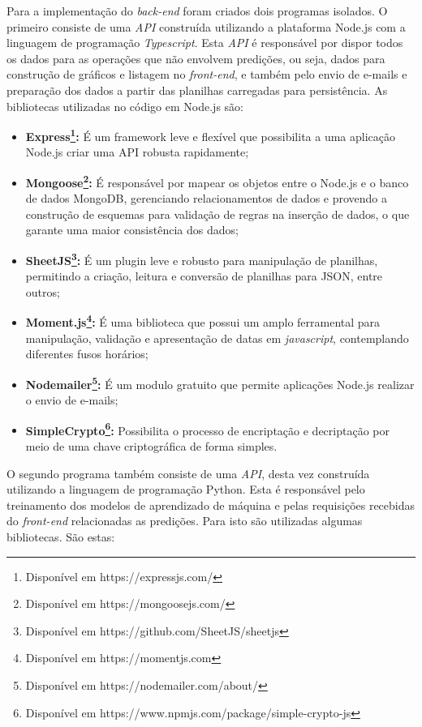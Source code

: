 Para a implementação do \textit{back-end} foram criados dois programas isolados. 
O primeiro consiste de uma \textit{API} construída utilizando a plataforma Node.js com a linguagem de programação \textit{Typescript}. 
Esta \textit{API} é responsável por dispor todos os dados para as operações que não envolvem predições, ou seja, dados para construção de gráficos e listagem no \textit{front-end}, e também pelo envio de e-mails e preparação dos dados a partir das planilhas carregadas para persistência.
As bibliotecas utilizadas no código em Node.js são:
\begin{itemize}[topsep=5pt]
    \item \textbf{Express\footnote{Disponível em https://expressjs.com/}:} É um framework leve e flexível que possibilita a uma aplicação Node.js criar uma API robusta rapidamente;
    \item \textbf{Mongoose\footnote{Disponível em https://mongoosejs.com/}:} É responsável por mapear os objetos entre o Node.js e o banco de dados MongoDB, gerenciando relacionamentos de dados e provendo a construção de esquemas para validação de regras na inserção de dados, o que garante uma maior consistência dos dados;
    \item \textbf{SheetJS\footnote{Disponível em https://github.com/SheetJS/sheetjs}:} É um plugin leve e robusto para manipulação de planilhas, permitindo a criação, leitura e conversão de planilhas para JSON, entre outros;
    \item \textbf{Moment.js\footnote{Disponível em https://momentjs.com}:} É uma biblioteca que possui um amplo ferramental para manipulação, validação e apresentação de datas em \textit{javascript}, contemplando diferentes fusos horários;
    \item \textbf{Nodemailer\footnote{Disponível em https://nodemailer.com/about/}:} É um modulo gratuito que permite aplicações Node.js realizar o envio de e-mails;
    \item \textbf{SimpleCrypto\footnote{Disponível em https://www.npmjs.com/package/simple-crypto-js}:} Possibilita o processo de encriptação e decriptação por meio de uma chave criptográfica de forma simples.
\end{itemize}

O segundo programa também consiste de uma \textit{API}, desta vez construída utilizando a linguagem de programação Python. 
Esta é responsável pelo treinamento dos modelos de aprendizado de máquina e pelas requisições recebidas do \textit{front-end} relacionadas as predições. 
Para isto são utilizadas algumas bibliotecas. São estas:

